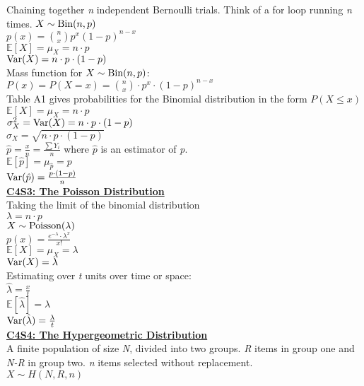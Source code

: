 \documentclass[letter, 12pt]{article}
\begin{document}
\begin{multicols}{2}
Chaining together \textit{n} independent Bernoulli trials. Think of a for loop running \textit{n} times.
\(X \sim \textnormal{Bin}(n, p)\)\\
\(p(x) = {n \choose x} p^x(1-p)^{n-x}\)\\
\(\mathds{E}[X] = \mu_X = n\cdot p\)\\
\(\textnormal{Var}(X) = n\cdot p\cdot(1-p)\)\\
Mass function for \(X \sim \textnormal{Bin}(n, p)\):\\
\(P(x) = P(X = x) = {n \choose x} \cdot p^x \cdot (1-p)^{n-x}\)\\
Table A1 gives probabilities for the Binomial distribution in the form \(P(X \leq x)\)\\
\(\mathds{E}[X] = \mu_X  = n\cdot p\)\\
\(\sigma^2_X = \textnormal{Var}(X) = n\cdot p \cdot (1-p)\)\\
\(\sigma_X = \sqrt{n\cdot p \cdot (1-p)}\)\\
\(\hat{p} = \frac{x}{n} = \frac{\sum Y_i}{n}\) where \(\hat{p}\) is an estimator of \textit{p}.\\
\(\mathds{E}[\hat{p}] = \mu_{\hat{p}}  = p\)\\
\(\textnormal{Var}(\hat{p}) = \frac{p\cdot (1-p)}{n}\)\\
\textbf{\uline{C4S3: The Poisson Distribution}}\\
Taking the limit of the binomial distribution\\
\(\lambda = n \cdot p\)\\
\(X \sim \textnormal{Poisson}(\lambda)\)\\
\(p(x) = \frac{e^{-\lambda}\cdot \lambda^x}{x!}\)\\
\(\mathds{E}[X] = \mu_X = \lambda\)\\
\(\textnormal{Var}(X) = \lambda\)\\
Estimating over \textit{t} units over time or space:\\
\(\hat{\lambda} = \frac{x}{t}\)\\
\(\mathds{E}[\hat{\lambda}] = \lambda\)\\
\(\textnormal{Var}(\hat{\lambda}) = \frac{\lambda}{t}\)\\
\textbf{\uline{C4S4: The Hypergeometric Distribution}}\\
A finite population of size \textit{N}, divided into two groups. \textit{R} items in group one and \textit{N-R} in group two. \textit{n} items selected without replacement.\\
\(X \sim H(N, R, n)\)\\

\end{multicols}
\end{document}
